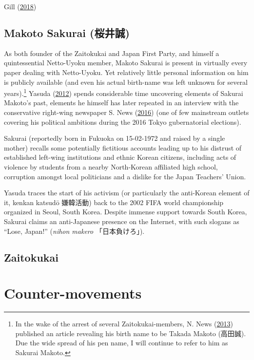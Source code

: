 \documentclass[10pt,british,A4paper,,openany]{memoir}
\begin{document}
Gill (\protect\hyperlink{ref-gill_nativist_2018}{2018})

\subsection{Makoto Sakurai
(桜井誠)}\label{makoto-sakurai-ux685cux4e95ux8aa0}

As both founder of the Zaitokukai and Japan First Party, and himself a
quintessential Netto-Uyoku member, Makoto Sakurai is present in
virtually every paper dealing with Netto-Uyoku. Yet relatively little
personal information on him is publicly available (and even his actual
birth-name was left unknown for several years).\footnote{In the wake of
  the arrest of several Zaitokukai-members, N. News
  (\protect\hyperlink{ref-nikkei_news__2013}{2013}) published an article
  revealing his birth name to be Takada Makoto (高田誠). Due the wide
  spread of his pen name, I will continue to refer to him as Sakurai
  Makoto.} Yasuda (\protect\hyperlink{ref-yasuda_eng:_2012}{2012})
spends considerable time uncovering elements of Sakurai Makoto's past,
elements he himself has later repeated in an interview with the
conservative right-wing newspaper S. News
(\protect\hyperlink{ref-sankei_news__2016}{2016}) (one of few mainstream
outlets covering his political ambitions during the 2016 Tokyo
gubernatorial elections).

Sakurai (reportedly born in Fukuoka on 15-02-1972 and raised by a single
mother) recalls some potentially fictitious accounts leading up to his
distrust of established left-wing institutions and ethnic Korean
citizens, including acts of violence by students from a nearby
North-Korean affiliated high school, corruption amongst local
politicians and a dislike for the Japan Teachers' Union.

Yasuda traces the start of his activism (or particularly the anti-Korean
element of it, kenkan katsudō 嫌韓活動) back to the 2002 FIFA world
championship organized in Seoul, South Korea. Despite immense support
towards South Korea, Sakurai claims an anti-Japanese presence on the
Internet, with such slogans as ``Lose, Japan!'' (\emph{nihon makero}
「日本負けろ」).

\subsection{Zaitokukai}\label{zaitokukai}

\section{Counter-movements}\label{counter-movements}
\end{document}
